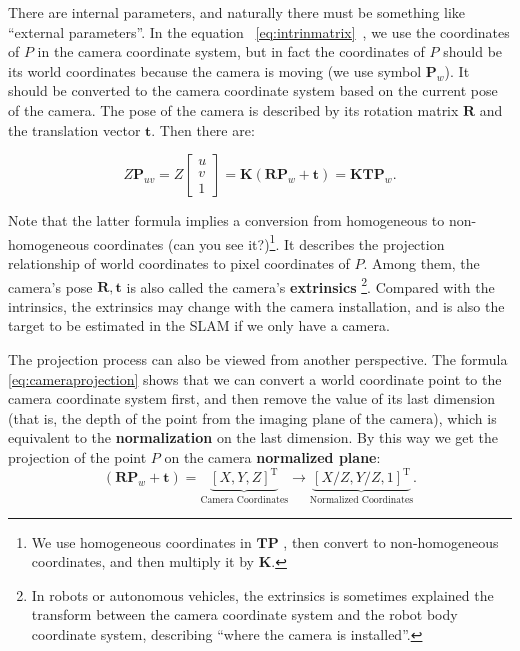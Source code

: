 There are internal parameters, and naturally there must be something like ``external parameters''. In the equation ~\eqref{eq:intrinmatrix}~, we use the coordinates of $P$ in the camera coordinate system, but in fact the  coordinates of $P$ should be its world coordinates because the camera is moving (we use symbol $\mathbf{P}_w$). It should be converted to the camera coordinate system based on the current pose of the camera. The pose of the camera is described by its rotation matrix $\mathbf{R}$ and the translation vector $\mathbf{t}$. Then there are:

\begin{equation}
\label{eq:cameraprojection}
Z \mathbf{P}_{uv}=
Z \left[ \begin{array}{l}
u\\
v\\
1
\end{array} \right] = \mathbf{K} \left( {\mathbf{R}{ \mathbf{P}_w} + \mathbf{t}} \right) =  \mathbf{K} \mathbf{T} \mathbf{P}_w .
\end{equation}

Note that the latter formula implies a conversion from homogeneous to non-homogeneous coordinates (can you see it?)\footnote{We use homogeneous coordinates in $\mathbf{T}\mathbf{P}$ , then convert to non-homogeneous coordinates, and then multiply it by $\mathbf{K}$. }. It describes the projection relationship of world coordinates to pixel coordinates of $P$. Among them, the camera's pose $\mathbf{R}, \mathbf{t}$ is also called the camera's \textbf{extrinsics} \footnote{In robots or autonomous vehicles, the extrinsics is sometimes explained the transform between the camera coordinate system and the robot body coordinate system, describing ``where the camera is installed''. }. Compared with the intrinsics, the extrinsics may change with the camera installation, and is also the target to be estimated in the SLAM if we only have a camera.

The projection process can also be viewed from another perspective. The formula \eqref{eq:cameraprojection} shows that we can convert a world coordinate point to the camera coordinate system first, and then remove the value of its last dimension (that is, the depth of the point from the imaging plane of the camera), which is equivalent to the \textbf{normalization} on the last dimension. By this way we get the projection of the point $P$ on the camera \textbf{normalized plane}:
\begin{equation}
\left( {\mathbf{R}{\mathbf{P}_w} + \mathbf{t}} \right) = \underbrace{\left[ X,Y,Z\right]^\mathrm{T}}_{\text{Camera Coordinates}} \to \underbrace {\left[ {X/Z,Y/Z,1} \right]^\mathrm{T}}_{\text{Normalized Coordinates}}.
\end{equation}


